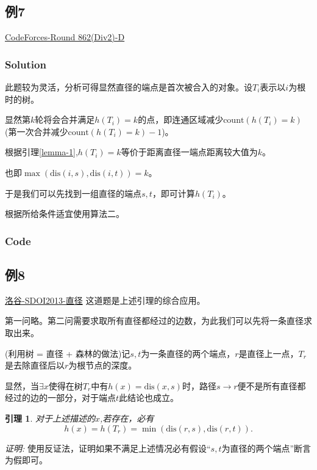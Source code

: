 \documentclass{article}
\newtheorem{lemma}{引理}
\newcommand{\dis}{\text{dis}}
\newcommand{\inputcppfile}[1]{}
\begin{document}
\subsection{例7}
\href{https://codeforces.com/contest/1805/problem/D}{CodeForces-Round 862(Div2)-D}
\subsubsection{Solution}

此题较为灵活，分析可得显然直径的端点是首次被合入的对象。设$T_i$表示以$i$为根时的树。

显然第$k$轮将会合并满足$h(T_i) = k$的点，即连通区域减少$\text{count}(h(T_i)=k)$(第一次合并减少$\text{count}(h(T_i)=k)-1$)。

根据引理\ref{lemma-1},$h(T_i) = k$等价于距离直径一端点距离较大值为$k$。

也即$\max(\dis(i,s),\dis(i,t)) = k$。

于是我们可以先找到一组直径的端点$s,t$，即可计算$h(T_i)$。

根据所给条件适宜使用算法二。

\subsubsection{Code}
\inputcppfile{Code_7.cpp}

\subsection{例8}
\href{https://www.luogu.com.cn/problem/P3304}{洛谷-SDOI2013-直径}
这道题是上述引理的综合应用。

第一问略。第二问需要求取所有直径都经过的边数，为此我们可以先将一条直径求取出来。

(利用树 = 直径 + 森林的做法)记$s,t$为一条直径的两个端点，$r$是直径上一点，$T_r$是去除直径后以$r$为根节点的深度。

显然，当$\exists x $使得在树$T_r$中有$h(x) = \dis(x,s)$时，路径$s \rightarrow r$便不是所有直径都经过的边的一部分，对于端点$t$此结论也成立。
\begin{lemma}
    对于上述描述的$x$,若存在，必有
    \begin{equation}
        h(x) = h(T_r) = \min(\dis(r,s),\dis(r,t)).
    \end{equation}
\end{lemma}

\emph{证明:}
使用反证法，证明如果不满足上述情况必有假设``$s,t$为直径的两个端点''断言为假即可。
\end{document}
